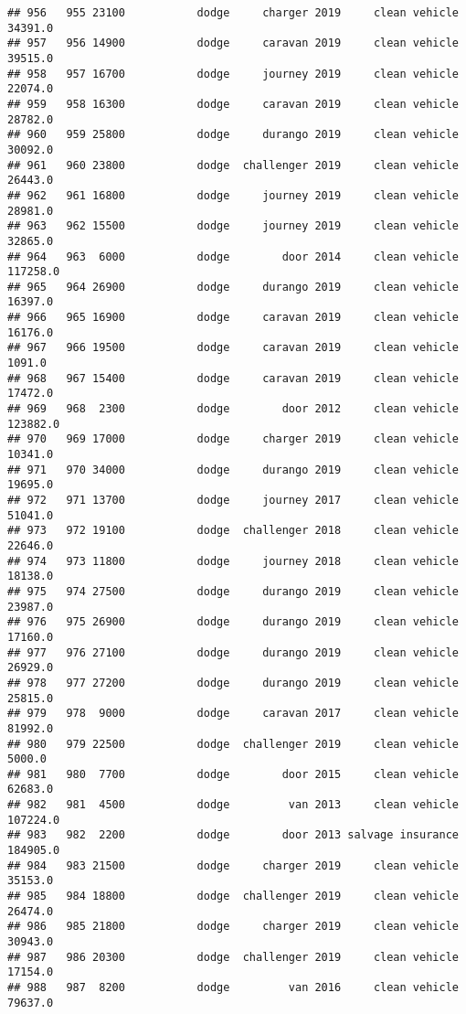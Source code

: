 \documentclass[
]{article}
\begin{document}
\begin{verbatim}
## 956   955 23100           dodge     charger 2019     clean vehicle   34391.0
## 957   956 14900           dodge     caravan 2019     clean vehicle   39515.0
## 958   957 16700           dodge     journey 2019     clean vehicle   22074.0
## 959   958 16300           dodge     caravan 2019     clean vehicle   28782.0
## 960   959 25800           dodge     durango 2019     clean vehicle   30092.0
## 961   960 23800           dodge  challenger 2019     clean vehicle   26443.0
## 962   961 16800           dodge     journey 2019     clean vehicle   28981.0
## 963   962 15500           dodge     journey 2019     clean vehicle   32865.0
## 964   963  6000           dodge        door 2014     clean vehicle  117258.0
## 965   964 26900           dodge     durango 2019     clean vehicle   16397.0
## 966   965 16900           dodge     caravan 2019     clean vehicle   16176.0
## 967   966 19500           dodge     caravan 2019     clean vehicle    1091.0
## 968   967 15400           dodge     caravan 2019     clean vehicle   17472.0
## 969   968  2300           dodge        door 2012     clean vehicle  123882.0
## 970   969 17000           dodge     charger 2019     clean vehicle   10341.0
## 971   970 34000           dodge     durango 2019     clean vehicle   19695.0
## 972   971 13700           dodge     journey 2017     clean vehicle   51041.0
## 973   972 19100           dodge  challenger 2018     clean vehicle   22646.0
## 974   973 11800           dodge     journey 2018     clean vehicle   18138.0
## 975   974 27500           dodge     durango 2019     clean vehicle   23987.0
## 976   975 26900           dodge     durango 2019     clean vehicle   17160.0
## 977   976 27100           dodge     durango 2019     clean vehicle   26929.0
## 978   977 27200           dodge     durango 2019     clean vehicle   25815.0
## 979   978  9000           dodge     caravan 2017     clean vehicle   81992.0
## 980   979 22500           dodge  challenger 2019     clean vehicle    5000.0
## 981   980  7700           dodge        door 2015     clean vehicle   62683.0
## 982   981  4500           dodge         van 2013     clean vehicle  107224.0
## 983   982  2200           dodge        door 2013 salvage insurance  184905.0
## 984   983 21500           dodge     charger 2019     clean vehicle   35153.0
## 985   984 18800           dodge  challenger 2019     clean vehicle   26474.0
## 986   985 21800           dodge     charger 2019     clean vehicle   30943.0
## 987   986 20300           dodge  challenger 2019     clean vehicle   17154.0
## 988   987  8200           dodge         van 2016     clean vehicle   79637.0

\end{verbatim}
\end{document}
